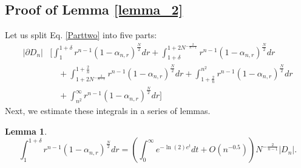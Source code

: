\documentclass[10pt, twoside, leqno]{article}
\newtheorem{lemma}[thm]{Lemma}
\theoremstyle{definition}
\numberwithin{equation}{section}
\newcommand{\NN}{N^{-\frac 2{n-1} }}
\begin{document}
\subsection{Proof of Lemma \ref{lemma_2}}
Let us split Eq. \eqref{Parttwo} into five parts:
\begin{equation}
\begin{aligned}|\partial D_{n}| & \bigg[\int_{1}^{1+\delta}r^{n-1}\left(1-\alpha_{n,r}\right)^{\frac{N}{2}}dr+\int_{1+\delta}^{1+2\NN}r^{n-1}\left(1-\alpha_{n,r}\right)^{\frac{N}{2}}dr\\
& \quad+\int_{1+2\NN}^{1+\frac{2}{n}}r^{n-1}\left(1-\alpha_{n,r}\right)^{\frac{N}{2}}dr+\int_{1+\frac{2}{n}}^{n^{2}}r^{n-1}\left(1-\alpha_{n,r}\right)^{\frac{N}{2}}dr\\
& \quad+\int_{n^{2}}^{\infty}r^{n-1}\left(1-\alpha_{n,r}\right)^{\frac{N}{2}}dr\bigg]
\end{aligned}
\end{equation}
Next, we estimate these integrals in a series of lemmas.
\begin{lemma}
\[
\int_{1}^{1+\delta}r^{n-1}\left(1-\alpha_{n,r}\right)^{\frac {N}{2}}dr = \left(\int_{0}^{\infty}e^{-\ln(2)e^{t}}dt+O\left(n^{-0.5}\right)\right)\NN|D_{n}|.
\]
\end{lemma}
\end{document}
